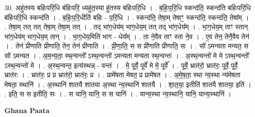 \documentclass[17pt]{extarticle}
\begin{document}
30. अहु॑तस्य बहिःपरि॒धि ब॑हिःपरि॒ ध्यहु॑त॒स्या हु॑तस्य बहिःपरि॒धि । . ब॒हिः॒प॒रि॒धि स्कन्द॑ति॒ स्कन्द॑ति बहिःपरि॒धि ब॑हिःपरि॒धि स्कन्द॑ति । . ब॒हिः॒प॒रि॒धीति॑ बहिः - प॒रि॒धि । . स्कन्द॑ति॒ तेषा॒म् तेषाꣳ॒॒ स्कन्द॑ति॒ स्कन्द॑ति॒ तेषा᳚म् । . तेषा॒म् तत् तत् तेषा॒म् तेषा॒म् तत् । . तद् भा॑ग॒धेय॑म् भाग॒धेय॒म् तत् तद् भा॑ग॒धेय᳚म् । . भा॒ग॒धेय॒म् ताꣳ स्तान् भा॑ग॒धेय॑म् भाग॒धेय॒म् तान् । . भा॒ग॒धेय॒मिति॑ भाग - धेय᳚म् । . ता ने॒वैव ताꣳ स्ता ने॒व । . ए॒व तेन॒ तेनै॒वैव तेन॑ । . तेन॑ प्रीणाति प्रीणाति॒ तेन॒ तेन॑ प्रीणाति । . प्री॒णा॒ति॒ स स प्री॑णाति प्रीणाति॒ सः । . सो॑ ऽमन्यता मन्यत॒ स सो॑ ऽमन्यत । . अ॒म॒न्य॒ता॒ स्थ॒न्वन्तो᳚ ऽस्थ॒न्वन्तो॑ ऽमन्यता मन्यता स्थ॒न्वन्तः॑ । . अ॒स्थ॒न्वन्तो॑ मे मे ऽस्थ॒न्वन्तो᳚ ऽस्थ॒न्वन्तो॑ मे । . अ॒स्थ॒न्वन्त॒ इत्य॑स्थन्न् - वन्तः॑ । . मे॒ पूर्वे॒ पूर्वे॑ मे मे॒ पूर्वे᳚ । . पूर्वे॒ भ्रात॑रो॒ भ्रात॑रः॒ पूर्वे॒ पूर्वे॒ भ्रात॑रः । . भ्रात॑रः॒ प्र प्र भ्रात॑रो॒ भ्रात॑रः॒ प्र । . प्रामे॑षता मेषत॒ प्र प्रामे॑षत । . अ॒मे॒ष॒ता॒ स्था न्य॒स्था न्य॑मेषता मेषता॒ स्थानि॑ । . अ॒स्थानि॑ शातयै शातया अ॒स्था न्य॒स्थानि॑ शातयै । . शा॒त॒या॒ इतीति॑ शातयै शातया॒ इति॑ । . इति॒ स स इतीति॒ सः । . स यानि॒ यानि॒ स स यानि॑ । . यान्य॒स्था न्य॒स्थानि॒ यानि॒ यान्य॒स्थानि॑ । \newline

\textbf{Ghana Paata } \newline
\end{document}
